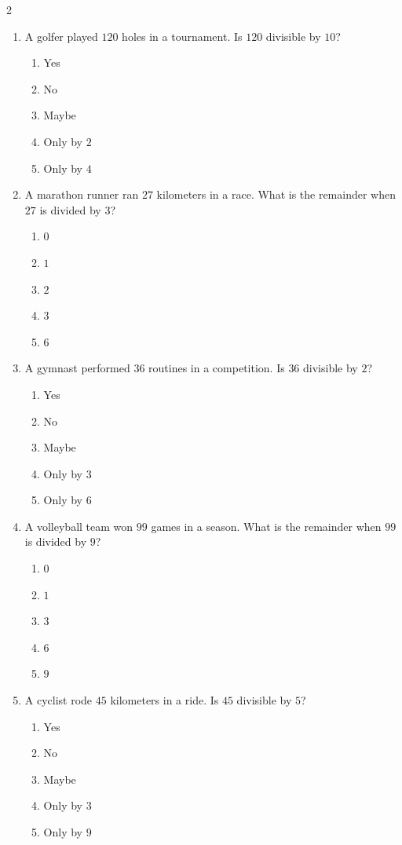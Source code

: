 \documentclass[10pt]{article}
\begin{document}
\begin{multicols}{2}
\begin{enumerate}[label=\textbf{Q\arabic*.}, leftmargin=*, itemsep=6pt, parsep=0pt]
  \item \small A golfer played $120$ holes in a tournament. Is $120$ divisible by $10$?
  \begin{enumerate}[label=(\Alph*), leftmargin=0.6cm, nosep, itemsep=2pt]
    \item Yes
    \item No
    \item Maybe
    \item Only by $2$
    \item Only by $4$
  \end{enumerate}

  \item \small A marathon runner ran $27$ kilometers in a race. What is the remainder when $27$ is divided by $3$?
  \begin{enumerate}[label=(\Alph*), leftmargin=0.6cm, nosep, itemsep=2pt]
    \item $0$
    \item $1$
    \item $2$
    \item $3$
    \item $6$
  \end{enumerate}

  \item \small A gymnast performed $36$ routines in a competition. Is $36$ divisible by $2$?
  \begin{enumerate}[label=(\Alph*), leftmargin=0.6cm, nosep, itemsep=2pt]
    \item Yes
    \item No
    \item Maybe
    \item Only by $3$
    \item Only by $6$
  \end{enumerate}

  \item \small A volleyball team won $99$ games in a season. What is the remainder when $99$ is divided by $9$?
  \begin{enumerate}[label=(\Alph*), leftmargin=0.6cm, nosep, itemsep=2pt]
    \item $0$
    \item $1$
    \item $3$
    \item $6$
    \item $9$
  \end{enumerate}

  \item \small A cyclist rode $45$ kilometers in a ride. Is $45$ divisible by $5$?
  \begin{enumerate}[label=(\Alph*), leftmargin=0.6cm, nosep, itemsep=2pt]
    \item Yes
    \item No
    \item Maybe
    \item Only by $3$
    \item Only by $9$
  \end{enumerate}


\end{enumerate}
\end{multicols}
\end{document}

